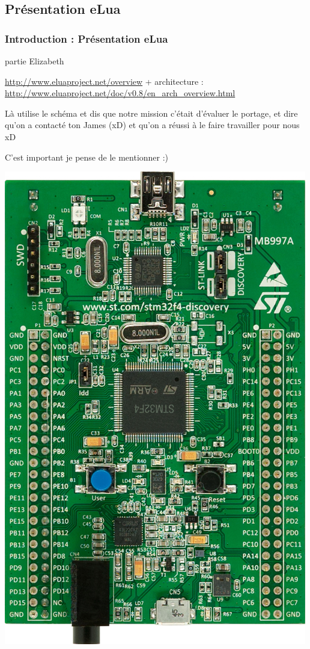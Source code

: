 \documentclass{beamer}
\begin{document}
\subsection{Présentation eLua}
\begin{frame}
\frametitle{Introduction : Présentation eLua}
partie Elizabeth

\url{http://www.eluaproject.net/overview} +
architecture : \url{http://www.eluaproject.net/doc/v0.8/en_arch_overview.html}


Là utilise le schéma et dis que notre mission c'était d'évaluer le portage, et dire
qu'on a contacté ton James (xD) et qu'on a réussi à le faire travailler pour nous xD

C'est important je pense de le mentionner :)
\begin{center}
 \includegraphics[scale=0.1]{../images/stm32f4_discovery.jpg}
\end{center}
\end{frame}
\end{document}
